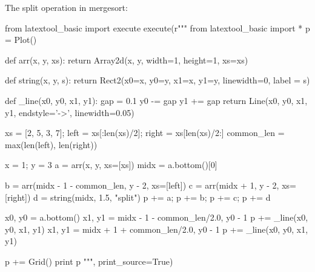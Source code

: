 The split operation in mergesort:
\begin{python}
from latextool_basic import execute
execute(r"""
from latextool_basic import *
p = Plot()

def arr(x, y, xs):
    return Array2d(x, y, width=1, height=1, xs=xs)

def string(x, y, s):
    return Rect2(x0=x, y0=y, x1=x, y1=y, linewidth=0, label = s)

def _line(x0, y0, x1, y1):
    gap = 0.1
    y0 -= gap
    y1 += gap
    return Line(x0, y0, x1, y1, endstyle='->', linewidth=0.05)

xs = [2, 5, 3, 7]; left = xs[:len(xs)/2]; right = xs[len(xs)/2:]
common_len = max(len(left), len(right))

x = 1; y = 3
a = arr(x, y, xs=[xs])
midx = a.bottom()[0]

b = arr(midx - 1 - common_len, y - 2, xs=[left])
c = arr(midx + 1, y - 2, xs=[right])
d = string(midx, 1.5, "split")
p += a; p += b; p += c; p += d

x0, y0 = a.bottom()
x1, y1 = midx - 1 - common_len/2.0, y0 - 1
p += _line(x0, y0, x1, y1)
x1, y1 = midx + 1 + common_len/2.0, y0 - 1
p += _line(x0, y0, x1, y1)

p += Grid()
print p
""", print_source=True)
\end{python}

